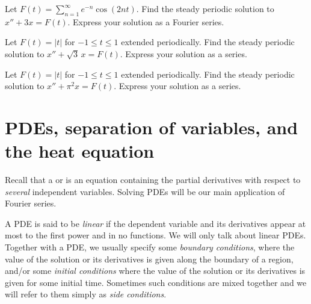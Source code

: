 \begin{exercise}
Let $F(t) = \sum_{n=1}^\infty e^{-n} \cos(2 n t)$.
Find the steady periodic solution to $x'' + 3 x = F(t)$.
Express your solution as a Fourier series.
\end{exercise}

\begin{exercise}
Let $F(t) = \lvert t \rvert$ for $-1 \leq t \leq 1$ extended periodically.
Find the steady periodic solution to $x'' + \sqrt{3}\, x = F(t)$.
Express your solution as a series.
\end{exercise}

\begin{exercise}
Let $F(t) = \lvert t \rvert$ for $-1 \leq t \leq 1$ extended periodically.
Find the steady periodic solution to $x'' + \pi^2 x = F(t)$.
Express your solution as a series.
\end{exercise}



\sectionnewpage
\section{PDEs, separation of variables, and the heat equation}
\label{heateq:section}



Recall that a \emph{} or
\emph{} is an equation containing the partial derivatives
with respect to \emph{several} independent variables.  Solving PDEs
will be our main application of Fourier series.

A PDE is said to be \emph{linear} if the dependent
variable and its derivatives appear at most to the first power and in no
functions.  We will only talk about linear PDEs.  Together with a PDE\@,
we usually specify some
\emph{boundary conditions},
where the value of the solution or its derivatives is given along
the boundary of a region, and/or
some 
\emph{initial conditions} where the value
of the solution or its derivatives is given for some initial time.
Sometimes such conditions are mixed together and we will refer to them
simply as 
\emph{side conditions}.

